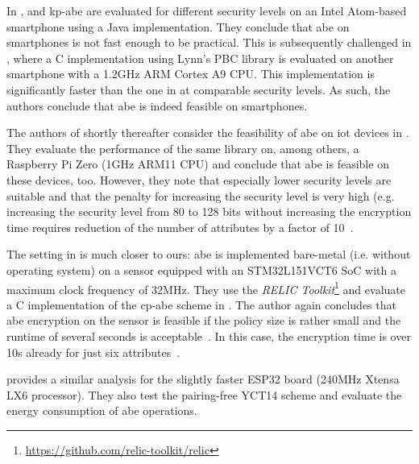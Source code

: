 In \cite{wang_performance_2014},  and \acrshort{kp-abe} are evaluated for different security levels on an Intel Atom-based smartphone using a Java implementation.
They conclude that \acrshort{abe} on smartphones is not fast enough to be practical.
This is subsequently challenged in \cite{ambrosin_feasibility_2015}, where a C implementation using Lynn's PBC library is evaluated on another smartphone with a 1.2GHz ARM Cortex A9 CPU.
This implementation is significantly faster than the one in \cite{wang_performance_2014} at comparable security levels.
As such, the authors conclude that \acrshort{abe} is indeed feasible on smartphones.

The authors of \cite{ambrosin_feasibility_2015} shortly thereafter consider the feasibility of \acrshort{abe} on \gls{iot} devices in \cite{ambrosin_feasibility_2016}.
They evaluate the performance of the same library on, among others, a Raspberry Pi Zero (1GHz ARM11 CPU) and conclude that \acrshort{abe} is feasible on these devices, too.
However, they note that especially lower security levels are suitable and that the penalty for increasing the security level is very high (e.g. increasing the security level from 80 to 128 bits without increasing the encryption time requires reduction of the number of attributes by a factor of 10~\cite{ambrosin_feasibility_2016}.

The setting in \cite{borgh_attribute-based_2016} is much closer to ours: \acrshort{abe} is implemented bare-metal (i.e. without operating system) on a sensor equipped with an STM32L151VCT6 SoC with a maximum clock frequency of 32MHz.
They use the \emph{RELIC Toolkit}\footnote{\url{https://github.com/relic-toolkit/relic}} and evaluate a C implementation of the \acrshort{cp-abe} scheme in \cite{waters_ciphertext-policy_2011}.
The author again concludes that \acrshort{abe} encryption on the sensor is feasible if the policy size is rather small and the runtime of several seconds is acceptable~\cite{borgh_attribute-based_2016}.
In this case, the encryption time is over 10s already for just six attributes~\cite{borgh_attribute-based_2016}.

\cite{girgenti_feasibility_2019} provides a similar analysis for the slightly faster ESP32 board (240MHz Xtensa LX6 processor).
They also test the pairing-free YCT14 scheme \cite{yao_lightweight_2015} and evaluate the energy consumption of \acrshort{abe} operations.

